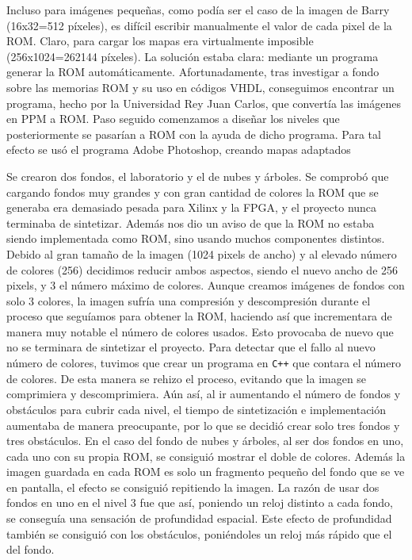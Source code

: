 \documentclass[11pt, a4paper, spanish, openright, twoside]{book}
\begin{document}
Incluso para imágenes pequeñas, como podía ser el caso de la imagen de Barry (16x32=512 píxeles), es difícil escribir manualmente el valor de cada pixel de la ROM. Claro, para cargar los mapas era virtualmente imposible (256x1024=262144 píxeles). La solución estaba clara: mediante un programa generar la ROM automáticamente. Afortunadamente, tras investigar a fondo sobre las memorias ROM y su uso en códigos VHDL, conseguimos encontrar un programa, hecho por la Universidad Rey Juan Carlos, que convertía las imágenes en PPM a ROM. Paso seguido comenzamos a diseñar los niveles que posteriormente se pasarían a ROM con la ayuda de dicho programa. Para tal efecto se usó el programa Adobe Photoshop, creando mapas adaptados 

Se crearon dos fondos, el laboratorio y el de nubes y árboles. Se comprobó que cargando fondos muy grandes y con gran cantidad de colores la ROM que se generaba era demasiado pesada para Xilinx y la FPGA, y el proyecto nunca terminaba de sintetizar. Además nos dio un aviso de que la ROM no estaba siendo implementada como ROM, sino usando muchos componentes distintos. Debido al gran tamaño de la imagen (1024 pixels de ancho) y al elevado número de colores (256) decidimos reducir ambos aspectos, siendo el nuevo ancho de 256 pixels, y 3 el número máximo de colores. Aunque creamos imágenes de fondos con solo 3 colores, la imagen sufría una compresión y descompresión durante el proceso que seguíamos para obtener la ROM, haciendo así que incrementara de manera muy notable el número de colores usados. Esto provocaba de nuevo que no se terminara de sintetizar el proyecto. Para detectar que el fallo al nuevo número de colores, tuvimos que crear un programa en \texttt{C++} que contara el número de colores. De esta manera se rehizo el proceso, evitando que la imagen se comprimiera y descomprimiera. Aún así, al ir aumentando el número de fondos y obstáculos para cubrir cada nivel, el tiempo de sintetización e implementación aumentaba de manera preocupante, por lo que se decidió crear solo tres fondos y tres obstáculos. En el caso del fondo de nubes y árboles, al ser dos fondos en uno, cada uno con su propia ROM, se consiguió mostrar el doble de colores. Además la imagen guardada en cada ROM es solo un fragmento pequeño del fondo que se ve en pantalla, el efecto se consiguió repitiendo la imagen.
La razón de usar dos fondos en uno en el nivel 3 fue que así, poniendo un reloj distinto a cada fondo, se conseguía una sensación de profundidad espacial. Este efecto de profundidad también se consiguió con los obstáculos, poniéndoles un reloj más rápido que el del fondo. 
\end{document}
